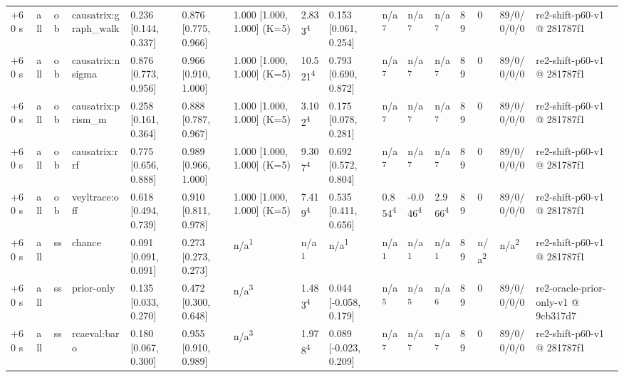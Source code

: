 \begin{table}[t]
\begin{tabular}{llllllllllllllll}
+60 s & all & ob & causatrix:graph\_walk & 0.236 [0.144, 0.337] & 0.876 [0.775, 0.966] & 1.000 [1.000, 1.000] (K=5) & 2.833\textsuperscript{4} & 0.153 [0.061, 0.254] & n/a\textsuperscript{7} & n/a\textsuperscript{7} & n/a\textsuperscript{7} & 89 & 0 & 89/0/0/0/0 & re2-shift-p60-v1 @ 281787f1 \\
+60 s & all & ob & causatrix:nsigma & 0.876 [0.773, 0.956] & 0.966 [0.910, 1.000] & 1.000 [1.000, 1.000] (K=5) & 10.521\textsuperscript{4} & 0.793 [0.690, 0.872] & n/a\textsuperscript{7} & n/a\textsuperscript{7} & n/a\textsuperscript{7} & 89 & 0 & 89/0/0/0/0 & re2-shift-p60-v1 @ 281787f1 \\
+60 s & all & ob & causatrix:prism\_m & 0.258 [0.161, 0.364] & 0.888 [0.787, 0.967] & 1.000 [1.000, 1.000] (K=5) & 3.102\textsuperscript{4} & 0.175 [0.078, 0.281] & n/a\textsuperscript{7} & n/a\textsuperscript{7} & n/a\textsuperscript{7} & 89 & 0 & 89/0/0/0/0 & re2-shift-p60-v1 @ 281787f1 \\
+60 s & all & ob & causatrix:rrf & 0.775 [0.656, 0.888] & 0.989 [0.966, 1.000] & 1.000 [1.000, 1.000] (K=5) & 9.307\textsuperscript{4} & 0.692 [0.572, 0.804] & n/a\textsuperscript{7} & n/a\textsuperscript{7} & n/a\textsuperscript{7} & 89 & 0 & 89/0/0/0/0 & re2-shift-p60-v1 @ 281787f1 \\
+60 s & all & ob & veyltrace:off & 0.618 [0.494, 0.739] & 0.910 [0.811, 0.978] & 1.000 [1.000, 1.000] (K=5) & 7.419\textsuperscript{4} & 0.535 [0.411, 0.656] & 0.854\textsuperscript{4} & -0.046\textsuperscript{4} & 2.966\textsuperscript{4} & 89 & 0 & 89/0/0/0/0 & re2-shift-p60-v1 @ 281787f1 \\
+60 s & all & ss & chance & 0.091 [0.091, 0.091] & 0.273 [0.273, 0.273] & n/a\textsuperscript{1} & n/a\textsuperscript{1} & n/a\textsuperscript{1} & n/a\textsuperscript{1} & n/a\textsuperscript{1} & n/a\textsuperscript{1} & 89 & n/a\textsuperscript{2} & n/a\textsuperscript{2} & re2-shift-p60-v1 @ 281787f1 \\
+60 s & all & ss & prior-only & 0.135 [0.033, 0.270] & 0.472 [0.300, 0.648] & n/a\textsuperscript{3} & 1.483\textsuperscript{4} & 0.044 [-0.058, 0.179] & n/a\textsuperscript{5} & n/a\textsuperscript{5} & n/a\textsuperscript{6} & 89 & 0 & 89/0/0/0/0 & re2-oracle-prior-only-v1 @ 9cb317d7 \\
+60 s & all & ss & rcaeval:baro & 0.180 [0.067, 0.300] & 0.955 [0.910, 0.989] & n/a\textsuperscript{3} & 1.978\textsuperscript{4} & 0.089 [-0.023, 0.209] & n/a\textsuperscript{7} & n/a\textsuperscript{7} & n/a\textsuperscript{7} & 89 & 0 & 89/0/0/0/0 & re2-shift-p60-v1 @ 281787f1 \\

\end{tabular}
\end{table}

